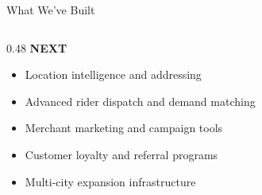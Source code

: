 \documentclass[aspectratio=169]{beamer}
\newcommand{\sectiontitle}[1]{\textbf{\large #1}}
\begin{document}
\begin{frame}{What We've Built}
\begin{columns}[T]
\begin{column}{0.48\textwidth}
      \vspace{6mm}
      \sectiontitle{NEXT}
      \vspace{3mm}
      \begin{itemize}
        \item Location intelligence and addressing
        \item Advanced rider dispatch and demand matching
        \item Merchant marketing and campaign tools
        \item Customer loyalty and referral programs
        \item Multi-city expansion infrastructure
      \end{itemize}
    \end{column}
  \end{columns}
\end{frame}
\end{document}
